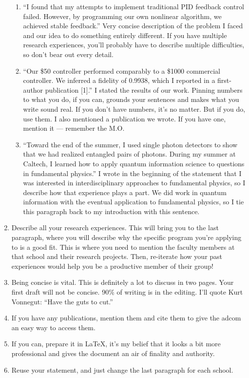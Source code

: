 \documentclass[12pt]{article}
\begin{document}
\begin{enumerate}
\begin{enumerate}
	\item ``I found that my attempts to implement traditional PID feedback control failed. However, by programming our own nonlinear algorithm, we achieved stable feedback.'' Very concise description of the problem I faced and our idea to do something entirely different. If you have multiple research experiences, you'll probably have to describe multiple difficulties, so don't bear out every detail.

	\item ``Our \$50 controller performed comparably to a \$1000 commercial controller. We inferred a fidelity of 0.9938, which I reported in a first-author publication [1].'' I stated the results of our work. Pinning numbers to what you do, if you can, grounds your sentences and makes what you write sound real. If you don't have numbers, it's no matter. But if you do, use them. I also mentioned a publication we wrote. If you have one, mention it --- remember the M.O.

	\item ``Toward the end of the summer, I used single photon detectors to show that we had realized entangled pairs of photons. During my summer at Caltech, I learned how to apply quantum information science to questions in fundamental physics.'' I wrote in the beginning of the statement that I was interested in interdisciplinary approaches to fundamental physics, so I describe how that experience plays a part. We did work in quantum information with the eventual application to fundamental physics, so I tie this paragraph back to my introduction with this sentence.
	\end{enumerate}

	\item Describe all your research experiences. This will bring you to the last paragraph, where you will describe why the specific program you're applying to is a good fit. This is where you need to mention the faculty members at that school and their research projects. Then, re-iterate how your past experiences would help you be a productive member of their group! 

	\item Being concise is vital. This is definitely a lot to discuss in two pages. Your first draft will not be concise. 90\% of writing is in the editing. I'll quote Kurt Vonnegut: ``Have the guts to cut.''

	\item If you have any publications, mention them and cite them to give the adcom an easy way to access them.

	\item If you can, prepare it in \LaTeX, it's my belief that it looks a bit more professional and gives the document an air of finality and authority.

	\item Reuse your statement, and just change the last paragraph for each school. 
\end{enumerate}
\end{document}
